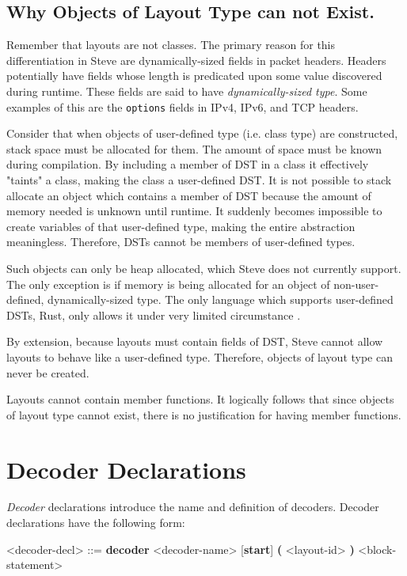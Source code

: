 \subsection{Why Objects of Layout Type can not Exist.}

Remember that layouts are not classes. The primary reason for this differentiation in Steve are dynamically-sized fields in packet headers. Headers potentially have fields whose length is predicated upon some value discovered during runtime. These fields are said to have \textit{dynamically-sized type}. Some examples of this are the \texttt{options} fields in IPv4, IPv6, and TCP headers. 

Consider that when objects of user-defined type (i.e. class type) are constructed, stack space must be allocated for them. The amount of space must be known during compilation. By including a member of DST in a class it effectively "taints" a class, making the class a user-defined DST. It is not possible to stack allocate an object which contains a member of DST because the amount of memory needed is unknown until runtime. It suddenly becomes impossible to create variables of that user-defined type, making the entire abstraction meaningless. Therefore, DSTs cannot be members of user-defined types. 

Such objects can only be heap allocated, which Steve does not currently support. The only exception is if memory is being allocated for an object of non-user-defined, dynamically-sized type. The only language which supports user-defined DSTs, Rust, only allows it under very limited circumstance \cite{rust_dst_std}.

By extension, because layouts must contain fields of DST, Steve cannot allow layouts to behave like a user-defined type. Therefore, objects of layout type can never be created.
  
Layouts cannot contain member functions. It logically follows that since objects of layout type cannot exist, there is no justification for having member functions.

\section{Decoder Declarations} \label{decoder_guide}

\textit{Decoder} declarations introduce the name and definition of decoders. Decoder declarations have the following form:

\begin{minip}
\begin{grammar}
\singlespace
<decoder-decl> ::=
\textbf{decoder} <decoder-name> [\textbf{start}] 
\textbf{(} <layout-id> \textbf{)}
<block-statement>
\end{grammar}
\end{minip}

